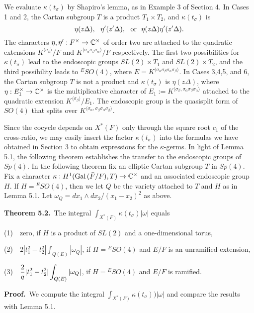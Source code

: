 We evaluate $\kappa(t_\sigma)$ by Shapiro's lemma, as in
Example 3 of Section 4.  In Cases 1 and 2, the Cartan
subgroup  $T$ is a product $T_1\times
T_2$, and $\kappa(t_\sigma)$ is
$$\eta(z\Delta),\ \ \eta'(z'\Delta),\ \hbox{ or }\ \eta(z\Delta)\eta'%
(z'\Delta).$$
The characters $\eta,\eta':F^\times\to {\Bbb C}^\times$ 
of order two are 
attached to the quadratic extensions $K^{\langle\sigma_\beta\rangle}/F$
and $K^{\langle\sigma_\alpha\sigma_\beta\sigma_\alpha\rangle}/F$
respectively.  The first two possibilities for $\kappa(t_\sigma)$
lead to the endoscopic groups $SL(2)\times T_1$ and $SL(2)\times T_2$,
and the third possibility leads to ${}^ESO(4)$, where
$E=K^{\langle\sigma_\alpha\sigma_\beta\sigma_\alpha\sigma_\beta
\rangle}$.
In Cases 3,4,5, and 6, the Cartan subgroup
$T$ is not a product and $\kappa(t_\sigma)$
is $\eta(z\Delta)$, where $\eta:E_1^\times\to {\Bbb C}^\times$
is the multiplicative 
character of $E_1 := K^{\langle
\sigma_\beta,\sigma_\alpha\sigma_\beta
\sigma_\alpha\rangle}$ attached to the quadratic extension
$K^{\langle\sigma_\beta\rangle}/E_1$.  The endoscopic group is
the quasisplit form of $SO(4)$ that splits over $K^{\langle
\sigma_\alpha,\sigma_\beta\sigma_\alpha\sigma_\beta\rangle}$.

Since the cocycle depends on $X^*(F)$ only through the square
root $c_1$ of the cross-ratio, we may easily insert the
factor $\kappa(t_\sigma)$ into the formulas we have
obtained in Section 3 to obtain expressions for the $\kappa$-germs.
In light of Lemma 5.1, the following theorem establishes
the transfer to the endoscopic groups of $Sp(4)$.  In the
following theorem fix an elliptic Cartan subgroup $T$
in $Sp(4)$.  Fix a character $\kappa:H^1(\hbox{Gal\,}({\bar F}/F),T)\to {\Bbb C}^\times$
and an associated endoscopic group $H$.  If $H= {}^ESO(4)$,
then we let $Q$ be the variety attached to $T$ and $H$
as in Lemma 5.1.  Let $\omega_Q = dx_1\wedge dx_2/(x_1-x_2)^2$
as above.

\bigskip
\noindent
{\bf Theorem 5.2.}\ The integral 
$\int_{X^*(F)} \kappa(t_\sigma)|\omega|$ equals

\noindent
(1)\ \
  zero, if $H$ is a product of $SL(2)$ and a one-dimensional torus,

\noindent
(2)\ \  $\displaystyle 2 |t_1^2-t_2^2| \int_{Q(E)} |\omega_Q|$, if
$H = {}^ESO(4)$ and $E/F$ is an unramified extension,

\noindent
(3)\ \  $\displaystyle{2\over q} |t_1^2-t_2^2| \int_{Q(E)} |\omega_Q|$, if
$H = {}^ESO(4)$ and $E/F$ is ramified.

\bigskip
\noindent
{\bf Proof.}\ We compute the integral $\int_{X^*(F)} \kappa(t_\sigma))
|\omega|$ and compare the results with Lemma 5.1.

